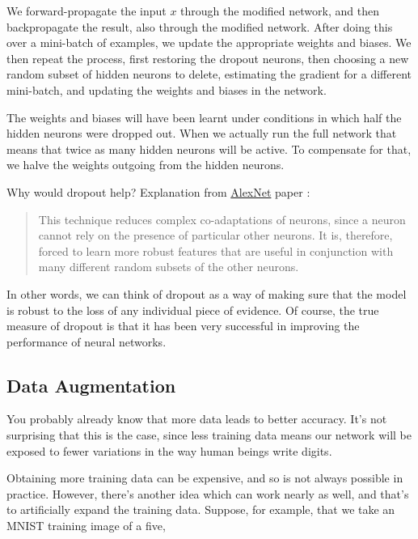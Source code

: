 \documentclass[a4paper]{tufte-handout}
\begin{document}
We forward-propagate the input \(x\) through the modified network, and
then backpropagate the result, also through the modified network. After
doing this over a mini-batch of examples, we update the appropriate
weights and biases. We then repeat the process, first restoring the
dropout neurons, then choosing a new random subset of hidden neurons to
delete, estimating the gradient for a different mini-batch, and updating
the weights and biases in the network.

The weights and biases will have been learnt under conditions in which
half the hidden neurons were dropped out. When we actually run the full
network that means that twice as many hidden neurons will be active. To
compensate for that, we halve the weights outgoing from the hidden
neurons.

Why would dropout help? Explanation from
\href{https://papers.nips.cc/paper/4824-imagenet-classification-with-deep-convolutional-neural-networks.pdf}{AlexNet}
paper :

\begin{quote}
This technique reduces complex co-adaptations of neurons, since a neuron
cannot rely on the presence of particular other neurons. It is,
therefore, forced to learn more robust features that are useful in
conjunction with many different random subsets of the other neurons.
\end{quote}

In other words, we can think of dropout as a way of making sure that the
model is robust to the loss of any individual piece of evidence. Of
course, the true measure of dropout is that it has been very successful
in improving the performance of neural networks.

\subsection{Data Augmentation}\label{data-augmentation}

You probably already know that more data leads to better accuracy. It's
not surprising that this is the case, since less training data means our
network will be exposed to fewer variations in the way human beings
write digits.

Obtaining more training data can be expensive, and so is not always
possible in practice. However, there's another idea which can work
nearly as well, and that's to artificially expand the training data.
Suppose, for example, that we take an MNIST training image of a five,
\end{document}
